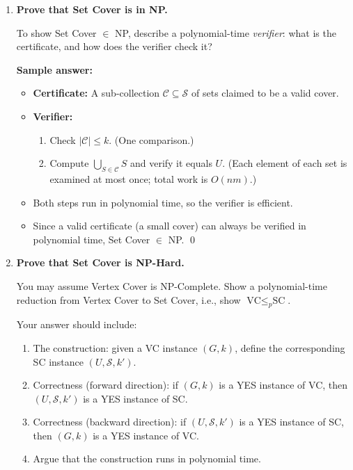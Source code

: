 \documentclass[11pt]{article}
\begin{document}
\begin{enumerate}[leftmargin=0pt, itemindent=1.7em, itemsep=1.2em]

\item \textbf{Prove that Set Cover is in NP.}

To show Set Cover $\in$ NP, describe a polynomial-time \emph{verifier}: what is the certificate, and how does the verifier check it?

\vspace{5.0cm}

\ifanswers
\textbf{Sample answer:}
\begin{itemize}
	\item \textbf{Certificate:} A sub-collection $\mathcal{C} \subseteq \mathcal{S}$ of sets claimed to be a valid cover.
	\item \textbf{Verifier:}
	\begin{enumerate}
		\item Check $|\mathcal{C}| \le k$. (One comparison.)
		\item Compute $\bigcup_{S \in \mathcal{C}} S$ and verify it equals $U$. (Each element of each set is examined at most once; total work is $O(nm)$.)
	\end{enumerate}
	\item Both steps run in polynomial time, so the verifier is efficient.
	\item Since a valid certificate (a small cover) can always be verified in polynomial time, Set Cover $\in$ NP. \qed
\end{itemize}
\fi

\item \textbf{Prove that Set Cover is NP-Hard.}

You may assume Vertex Cover is NP-Complete. Show a polynomial-time reduction from Vertex Cover to Set Cover, i.e., show $\text{VC} \le_p \text{SC}$.

Your answer should include:
\begin{enumerate}[label=(\alph*)]
	\item The construction: given a VC instance $(G, k)$, define the corresponding SC instance $(U, \mathcal{S}, k')$.
	\item Correctness (forward direction): if $(G, k)$ is a YES instance of VC, then $(U, \mathcal{S}, k')$ is a YES instance of SC.
	\item Correctness (backward direction): if $(U, \mathcal{S}, k')$ is a YES instance of SC, then $(G, k)$ is a YES instance of VC.
	\item Argue that the construction runs in polynomial time.
\end{enumerate}


\end{enumerate}
\end{document}
